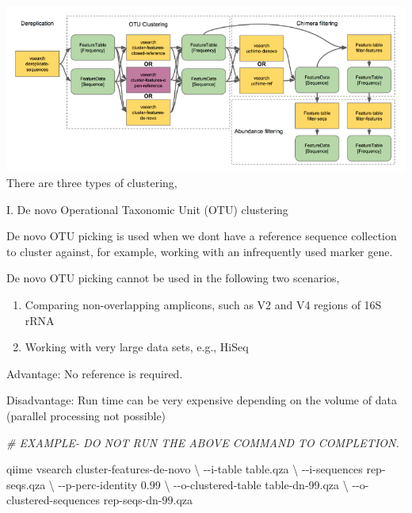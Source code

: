 \documentclass[
]{book}
\newenvironment{Shaded}{\begin{snugshade}}{\end{snugshade}}
\newcommand{\CommentTok}[1]{\textcolor[rgb]{0.56,0.35,0.01}{\textit{#1}}}
\newcommand{\DataTypeTok}[1]{\textcolor[rgb]{0.13,0.29,0.53}{#1}}
\newcommand{\ExtensionTok}[1]{#1}
\newcommand{\NormalTok}[1]{#1}
\begin{document}
\includegraphics[width=1\textwidth,height=\textheight]{./QIIMEpics/qiimeimage.png}
There are three types of clustering,

I. De novo Operational Taxonomic Unit (OTU) clustering

De novo OTU picking is used when we dont have a reference sequence collection to cluster against, for example, working with an infrequently used marker gene.

De novo OTU picking cannot be used in the following two scenarios,

\begin{enumerate}
\def\labelenumi{\arabic{enumi}.}
\item
  Comparing non-overlapping amplicons, such as V2 and V4 regions of 16S rRNA
\item
  Working with very large data sets, e.g., HiSeq
\end{enumerate}

Advantage: No reference is required.

Disadvantage: Run time can be very expensive depending on the volume of data (parallel processing not possible)

\begin{Shaded}
\begin{Highlighting}[]
\CommentTok{\# EXAMPLE{-} DO NOT RUN THE ABOVE COMMAND TO COMPLETION.}

\ExtensionTok{qiime}\NormalTok{ vsearch cluster{-}features{-}de{-}novo }\DataTypeTok{\textbackslash{}}
\NormalTok{{-}{-}i{-}table table.qza }\DataTypeTok{\textbackslash{}}
\NormalTok{{-}{-}i{-}sequences rep{-}seqs.qza }\DataTypeTok{\textbackslash{}}
\NormalTok{{-}{-}p{-}perc{-}identity 0.99 }\DataTypeTok{\textbackslash{}}
\NormalTok{{-}{-}o{-}clustered{-}table table{-}dn{-}99.qza }\DataTypeTok{\textbackslash{}}
\NormalTok{{-}{-}o{-}clustered{-}sequences rep{-}seqs{-}dn{-}99.qza}
\end{Highlighting}
\end{Shaded}
\end{document}
